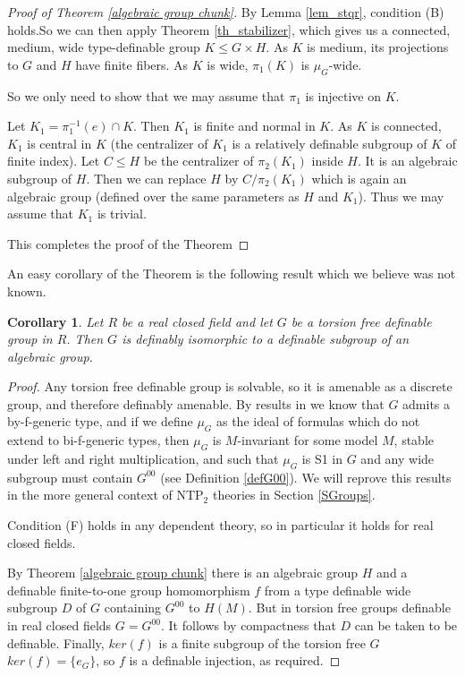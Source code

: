 \documentclass[12pt]{article}
\newtheorem{cor}[thm]{Corollary}
\theoremstyle{definition}
\theoremstyle{mystyle}
\theoremstyle{remark}
\begin{document}
\begin{proof}[Proof of Theorem \ref{algebraic group chunk}]
By Lemma \ref{lem_stqr}, condition (B) holds.So we can then apply
Theorem \ref{th_stabilizer}, which gives us a connected,  medium,
wide type-definable group $K\leq G\times H$. As $K$ is medium, its
projections to $G$ and $H$ have finite fibers. As $K$ is wide,
$\pi_1(K)$ is $\mu_G$-wide.

So we only need to show that we may assume that $\pi_1$ is
injective on $K$.

Let $K_1 = \pi_1^{-1}(e)\cap K$. Then $K_1$ is finite and normal
in $K$. As $K$ is connected, $K_1$ is central in $K$ (the
centralizer of $K_1$ is a relatively definable subgroup of $K$ of
finite index). Let $C\leq H$ be the centralizer of $\pi_2(K_1)$
inside $H$. It is an algebraic subgroup of $H$. Then we can
replace $H$ by $C/\pi_2(K_1)$ which is again an algebraic group
(defined over the same parameters as $H$ and $K_1$). Thus we may
assume that $K_1$ is trivial. %

This completes the proof of the Theorem
\end{proof}

An easy corollary of the Theorem is the following result which we
believe was not known.

\begin{cor}
Let $R$ be a real closed field and let $G$ be a torsion free
definable group in $R$. Then $G$ is definably isomorphic to a
definable subgroup of an algebraic group.
\end{cor}

\begin{proof}
Any torsion free definable group is solvable, so it is amenable as
a discrete group, and therefore definably amenable. By results in
\cite{CS} we know that $G$ admits a by-f-generic type, and if we
define $\mu_G$ as the ideal of formulas which do not extend to
bi-f-generic types, then $\mu_G$ is $M$-invariant for some model
$M$, stable under left and right multiplication, and such that
$\mu_G$ is S1 in $G$ and any wide subgroup must contain $G^{00}$
(see Definition \ref{defG00}). We will reprove this results in the
more general context of NTP$_2$ theories in Section \ref{SGroups}.

Condition (F) holds in any dependent theory, so in particular it
holds for real closed fields.

By Theorem \ref{algebraic group chunk} there is an algebraic group
$H$ and a definable finite-to-one group homomorphism $f$ from a
type definable wide subgroup $D$ of $G$ containing $G^{00}$ to
$H(M)$. But in torsion free groups definable in real closed fields
$G=G^{00}$. It follows by compactness that $D$ can be taken to be
definable. Finally, $ker(f)$ is a finite subgroup of the torsion
free $G$ $ker(f)=\{e_G\}$, so $f$ is a definable injection, as
required.
\end{proof}
\end{document}
